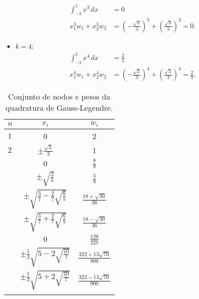 \begin{ex}
\begin{itemize}
  \begin{align}
    \int_{-1}^1 x^3\,dx &= 0\\
    x_1^3w_1 + x_2^3w_2 &= \left(-\frac{\sqrt{3}}{3}\right)^3 + \left(\frac{\sqrt{3}}{3}\right)^3 = 0.
  \end{align}
\item $k=4$:
  \begin{align}
    \int_{-1}^1 x^4\,dx &= \frac{2}{5}\\
    x_1^4w_1 + x_2^4w_2 &= \left(-\frac{\sqrt{3}}{3}\right)^4 + \left(\frac{\sqrt{3}}{3}\right)^4 = \frac{2}{9}.
  \end{align}
\end{itemize}
\end{ex}

\begin{table}[h!]
  \centering
  \caption{Conjunto de nodos e pesos da quadratura de Gauss-Legendre.}
  \begin{tabular}{lcc}
    $n$ & $x_i$ & $w_i$ \\\hline\noalign{\smallskip}
    $1$ & 0 & 2 \\\noalign{\smallskip}\hline
    $2$ & $\displaystyle \pm \frac{\sqrt{3}}{3}$ & 1\\\noalign{\smallskip}\hline\noalign{\smallskip}
    \multirow{2}{*}{$3$} & $0$ & $\displaystyle \frac{8}{9}$ \\
      & $\displaystyle \pm\sqrt{\frac{3}{5}}$ & $\displaystyle \frac{5}{9}$\\\noalign{\smallskip}\hline\noalign{\smallskip}
    \multirow{2}{*}{$4$} & $\displaystyle \pm\sqrt{\frac{3}{7}-\frac{2}{7}\sqrt{\frac{6}{5}}}$ & $\displaystyle \frac{18+\sqrt{30}}{36}$ \\\noalign{\smallskip}
 & $\displaystyle \pm\sqrt{\frac{3}{7}+\frac{2}{7}\sqrt{\frac{6}{5}}}$ & $\displaystyle \frac{18-\sqrt{30}}{36}$\\\noalign{\smallskip}\hline\noalign{\smallskip}
    \multirow{3}{*}{$5$} & $0$ & $\displaystyle \frac{128}{225}$ \\\noalign{\smallskip}
        & $\displaystyle \pm\frac{1}{3}\sqrt{5-2\sqrt{\frac{10}{7}}}$ & $\displaystyle \frac{322+13\sqrt{70}}{900}$ \\\noalign{\smallskip}
        & $\displaystyle \pm\frac{1}{3}\sqrt{5+2\sqrt{\frac{10}{7}}}$ & $\displaystyle \frac{322-13\sqrt{70}}{900}$ \\\noalign{\smallskip}\hline
  \end{tabular}
  \label{tab:Gauss-Legendre}
\end{table}

